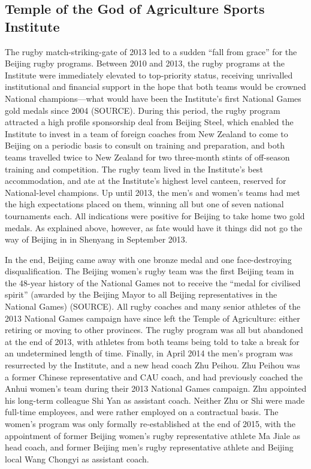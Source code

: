 {\subsection{Temple of the God of Agriculture Sports Institute}
The rugby match-striking-gate of 2013 led to a sudden ``fall from grace'' for the Beijing rugby programs.  Between 2010 and 2013, the rugby programs at the Institute were immediately elevated to top-priority status, receiving unrivalled institutional and financial support in the hope that both teams would be crowned National champions---what would have been the Institute's first National Games gold medals since 2004 (SOURCE).  During this period, the rugby program attracted a high profile sponsorship deal from Beijing Steel, which enabled the Institute to invest in a team of foreign coaches from New Zealand to come to Beijing on a periodic basis to consult on training and preparation, and both teams travelled twice to New Zealand for two three-month stints of off-season training and competition.  The rugby team lived in the Institute's best accommodation, and ate at the Institute's highest level canteen, reserved for National-level champions.  Up until 2013, the men's and women's teams had met the high expectations placed on them, winning all but one of seven national tournaments each. All indications were positive for Beijing to take home two gold medals. As explained above, however, as fate would have it things did not go the way of Beijing in in Shenyang in September 2013.

In the end, Beijing came away with one bronze medal and one face-destroying disqualification.  The Beijing women's rugby team was the first Beijing team in the 48-year history of the National Games not to receive the ``medal for civilised spirit''  (awarded by the Beijing Mayor to all Beijing representatives in the National Games) (SOURCE).  All rugby coaches and many senior athletes of the 2013 National Games campaign have since left the Temple of Agriculture: either retiring or moving to other provinces.  The rugby program was all but abandoned at the end of 2013, with athletes from both teams being told to take a break for an undetermined length of time. Finally, in April 2014 the men's program was resurrected by the Institute, and a new head coach Zhu Peihou. Zhu Peihou was a former Chinese representative and CAU coach, and had previously coached the Anhui women's team during their 2013 National Games campaign.  Zhu appointed his long-term colleague Shi Yan as assistant coach. Neither Zhu or Shi were made full-time employees, and were rather employed on a contractual basis.  The women's program was only formally re-established at the end of 2015, with the appointment of former Beijing women's rugby representative athlete Ma Jiale as head coach, and former Beijing men's rugby representative athlete and Beijing local Wang Chongyi as assistant coach.

}
